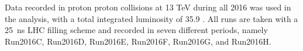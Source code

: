Data recorded in proton proton collisions at 13 TeV during all 2016 was used in the analysis, with a total integrated luminosity of  35.9 \fbinv.
All runs are taken with a 25~ns LHC filling scheme and recorded in seven different periods, namely Run2016C, Run2016D, Run2016E, Run2016F, Run2016G, and Run2016H.
